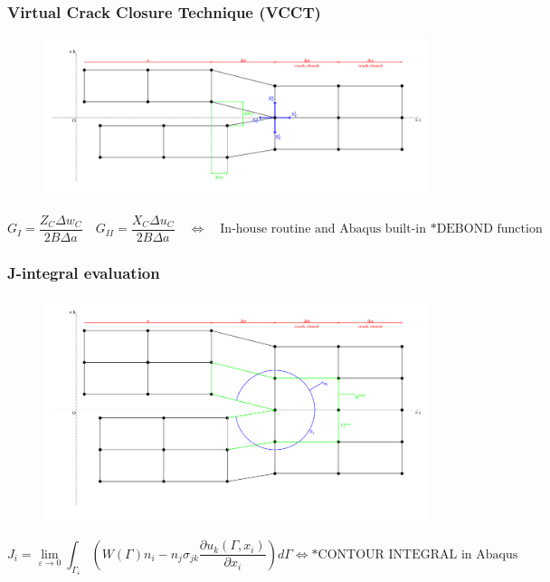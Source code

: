 \documentclass[first,firstsupp,lastsupp,handout,last,hyperref,table]{ETHclass}
\begin{document}
\begin{frame}
\frametitle{Virtual Crack Closure Technique (VCCT)}
\vspace{-1.5cm}
\centering
\begin{figure}[!h]
\centering
\includegraphics[height=0.6\textheight]{VCCT.pdf}
  \label{fig:vcct}
\end{figure}
\begin{equation*}
G_{I}=\frac{Z_{C}\Delta w_{C}}{2B\Delta a}\quad G_{II}=\frac{X_{C}\Delta u_{C}}{2B\Delta a}\quad\Longleftrightarrow\quad\text{In-house routine and Abaqus built-in *DEBOND function}
\end{equation*}
\end{frame}

\begin{frame}
\frametitle{J-integral evaluation}
\vspace{-0.75cm}
\centering
\begin{figure}[!h]
\centering
\includegraphics[height=0.6\textheight]{J-integral.pdf}
  \label{fig:jintegral}
\end{figure}
\scriptsize
\begin{equation*}
J_{i}=\lim_{\varepsilon\to 0}\int_{\Gamma_{\varepsilon}}\left(W\left(\Gamma\right)n_{i}-n_{j}\sigma_{jk}\frac{\partial u_{k}\left(\Gamma,x_{i}\right)}{\partial x_{i}}\right)d\Gamma\Longleftrightarrow\text{*CONTOUR INTEGRAL in Abaqus}
\end{equation*}
\end{frame}
\end{document}
